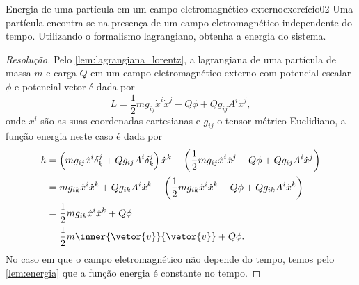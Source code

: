 \begin{exercício}{Energia de uma partícula em um campo eletromagnético externo}{exercício02}
    Uma partícula encontra-se na presença de um campo eletromagnético independente do tempo. Utilizando o formalismo lagrangiano, obtenha a energia do sistema.
\end{exercício}
\begin{proof}[Resolução]
    Pelo \cref{lem:lagrangiana_lorentz}, a lagrangiana de uma partícula de massa \(m\) e carga \(Q\) em um campo eletromagnético externo com potencial escalar \(\phi\) e potencial vetor  é dada por
    \begin{equation*}
        L = \frac12 m g_{ij} \dot{x}^i \dot{x}^j - Q\phi + Q g_{ij} A^i \dot{x}^j,
    \end{equation*}
    onde \(x^i\) são as suas coordenadas cartesianas e \(g_{ij}\) o tensor métrico Euclidiano, a função energia neste caso é dada por
    \begin{align*}
        h &= \left(mg_{ij} \dot{x}^i \delta^j_k + Q g_{ij} A^i \delta^j_k\right)\dot{x}^k - \left( \frac12 m g_{ij} \dot{x}^i \dot{x}^j - Q\phi +Q g_{ij} A^i \dot{x}^j\right)\\
          &= m g_{ik}\dot{x}^i \dot{x}^k + Qg_{ik}A^i\dot{x}^k - \left(\frac12 m g_{ik} \dot{x}^i \dot{x}^k - Q\phi + Qg_{ik} A^i \dot{x}^k\right)\\
          &= \frac12 m g_{ik} \dot{x}^i\dot{x}^k + Q\phi\\
          &= \frac12 m \inner{\vetor{v}}{\vetor{v}} + Q\phi.
    \end{align*}
    No caso em que o campo eletromagnético não depende do tempo, temos pelo \cref{lem:energia} que a função energia é constante no tempo.
\end{proof}
